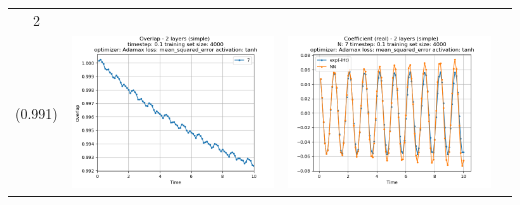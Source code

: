 \documentclass{article}
\begin{document}
\begin{tabular}{|c|c|c|c|}
     2 \\ (0.991) &
     \includegraphics[scale=0.37]{./2_layers_simple_train_samples=4000_timestep=0.1_t_total=10.0_optimizer=Adamax_loss=mean_squared_error_activation=tanh/Overlap.png} &
     \includegraphics[scale=0.37]{./2_layers_simple_train_samples=4000_timestep=0.1_t_total=10.0_optimizer=Adamax_loss=mean_squared_error_activation=tanh/Coeff_N=7_(real).png} &

\end{tabular}
\end{document}
